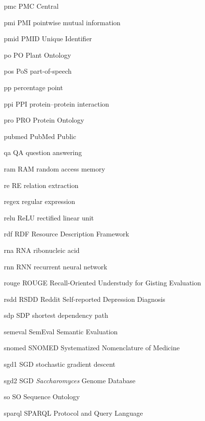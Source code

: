\newabbreviation
{pmc}
{PMC}
{ Central}

\newabbreviation
{pmi}
{PMI}
{pointwise mutual information}

\newabbreviation
{pmid}
{PMID}
{ Unique Identifier}

\newabbreviation
{po}
{PO}
{Plant Ontology}

\newabbreviation
{pos}
{PoS}
{part-of-speech}

{pp}
{percentage point}

\newabbreviation
{ppi}
{PPI}
{protein--protein interaction}

\newabbreviation
{pro}
{PRO}
{Protein Ontology}

\newabbreviation
{pubmed}
{PubMed}
{Public }

\newabbreviation
{qa}
{QA}
{question answering}

\newabbreviation
{ram}
{RAM}
{random access memory}

\newabbreviation
{re}
{RE}
{relation extraction}

{regex}
{regular expression}

\newabbreviation
{relu}
{ReLU}
{rectified linear unit}

\newabbreviation
{rdf}
{RDF}
{Resource Description Framework}

\newabbreviation
{rna}
{RNA}
{ribonucleic acid}

\newabbreviation
{rnn}
{RNN}
{recurrent neural network}

\newabbreviation
{rouge}
{ROUGE}
{Recall-Oriented Understudy for Gisting Evaluation}

\newabbreviation
{rsdd}
{RSDD}
{Reddit Self-reported Depression Diagnosis}

\newabbreviation
{sdp}
{SDP}
{shortest dependency path}

\newabbreviation
{semeval}
{SemEval}
{Semantic Evaluation}

\newabbreviation
{snomed}
{SNOMED}
{Systematized Nomenclature of Medicine}

\newabbreviation
{sgd1}
{SGD}
{stochastic gradient descent}

\newabbreviation
{sgd2}
{SGD}
{\textit{Saccharomyces} Genome Database}

\newabbreviation
{so}
{SO}
{Sequence Ontology}

\newabbreviation
{sparql}
{SPARQL}
{ Protocol and  Query Language}

